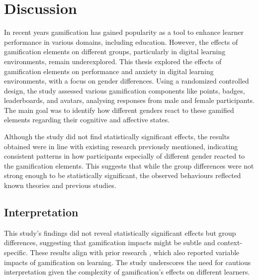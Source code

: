 \section{Discussion}
In recent years gamification has gained popularity as a tool to enhance learner performance in various domains, including education.
However, the effects of gamification elements on different groups, particularly in digital learning environments, remain underexplored.
This thesis explored the effects of gamification elements on performance and anxiety in digital learning environments, with a focus on gender differences.
Using a randomized controlled design, the study assessed various gamification components like points, badges, leaderboards, and avatars, analysing responses from male and female participants.
The main goal was to identify how different genders react to these gamified elements regarding their cognitive and affective states.

Although the study did not find statistically significant effects, the results obtained were in line with existing research previously mentioned, indicating consistent patterns in how participants especially of different gender reacted to the gamification elements.
This suggests that while the group differences were not strong enough to be statistically significant, the observed behaviours reflected known theories and previous studies.

\subsection{Interpretation}
This study's findings did not reveal statistically significant effects but group differences, suggesting that gamification impacts might be subtle and context-specific.
These results align with prior research \parencite{hamariDoesGamificationWork2014}, which also reported variable impacts of gamification on learning.
The study underscores the need for cautious interpretation given the complexity of gamification's effects on different learners.

